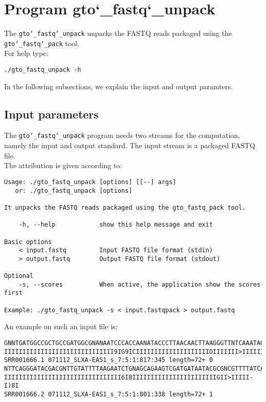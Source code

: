 \section{Program gto\char`_fastq\char`_unpack}
The \texttt{gto\char`_fastq\char`_unpack} unpacks the FASTQ reads packaged using the \texttt{gto\char`_fastq\char`_pack} tool.\\
For help type:
\begin{lstlisting}
./gto_fastq_unpack -h
\end{lstlisting}
In the following subsections, we explain the input and output paramters.

\subsection*{Input parameters}

The \texttt{gto\char`_fastq\char`_unpack} program needs two streams for the computation, namely the input and output standard. The input stream is a packaged FASTQ file.\\
The attribution is given according to:
\begin{lstlisting}
Usage: ./gto_fastq_unpack [options] [[--] args]
   or: ./gto_fastq_unpack [options]

It unpacks the FASTQ reads packaged using the gto_fastq_pack tool.

    -h, --help            show this help message and exit

Basic options
    < input.fastq         Input FASTQ file format (stdin)
    > output.fastq        Output FASTQ file format (stdout)

Optional
    -s, --scores          When active, the application show the scores first
    
Example: ./gto_fastq_unpack -s < input.fastqpack > output.fastq
\end{lstlisting}
An example on such an input file is:
\begin{lstlisting}
GNNTGATGGCCGCTGCCGATGGCGNANAATCCCACCAANATACCCTTAACAACTTAAGGGTTNTCAAATAGA
IIIIIIIIIIIIIIIIIIIIIIIIIIIIII9IG9ICIIIIIIIIIIIIIIIIIIIIDIIIIIII>IIIIII/
SRR001666.1 071112_SLXA-EAS1_s_7:5:1:817:345 length=72+	0
NTTCAGGGATACGACGNTTGTATTTTAAGAATCTGNAGCAGAAGTCGATGATAATACGCGNCGTTTTATCAN
IIIIIIIIIIIIIIIIIIIIIIIIIIIIIIII6IBIIIIIIIIIIIIIIIIIIIIIIIGII>IIIII-I)8I
SRR001666.2 071112_SLXA-EAS1_s_7:5:1:801:338 length=72+ 1
\end{lstlisting}

